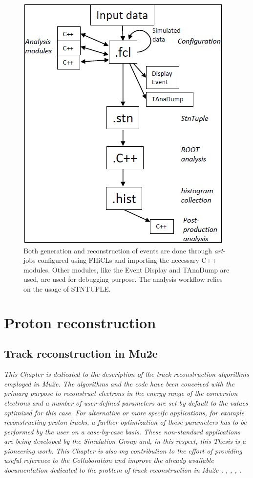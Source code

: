 \documentclass[12pt,a4paper,openright, oneside, titlepage]{book} %
\begin{document}
\begin{figure}[h!]
\centering
\includegraphics[scale=0.8]{mu2e_datahandling}
\caption{Both generation and reconstruction of events are done through \textit{art}-jobs configured using FHiCLs and importing the necessary C++ modules. 
Other modules, like the Event Display and TAnaDump are used, are used for debugging purpose.
The analysis workflow relies on the usage of STNTUPLE.}
\label{_mu2e_datahandling}
\end{figure}



\part{Proton reconstruction}
\chapter{Track reconstruction in Mu2e}
{\itshape This Chapter is dedicated to the description of the track reconstruction algorithms employed in Mu2e. 
The algorithms and the  code have been conceived with the primary purpose 
to reconstruct electrons in the energy range of the conversion electrons 
and a number of user-defined parameters are set by default to the values optimized for this  case.
For alternative or more specifc applications, for example reconstructing proton tracks, 
a further optimization of these parameters has to be performed by the user
on a case-by-case basis.
These non-standard applications are being developed by the 
Simulation Group and, in this respect, this Thesis is a pioneering work.
This Chapter is also my contribution to the effort of providing 
useful reference to the Collaboration and improve the
already available documentation dedicated to the problem of track reconstruction in Mu2e \cite{GianiPatRec:2016}, \cite{GianiPatRec:2020}, \cite{Brown:2014}, \cite{Kalman},  \cite{KutschkePaper}.}
\end{document}
